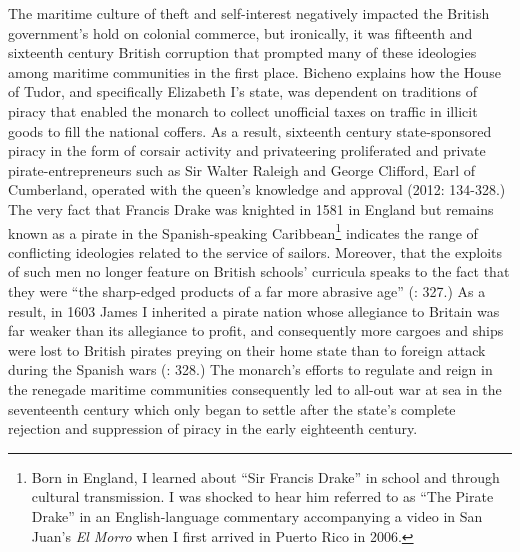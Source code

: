 The maritime culture of theft and self-interest negatively impacted the British government’s hold on colonial commerce, but ironically, it was fifteenth and sixteenth century British corruption that prompted many of these ideologies among maritime communities in the first place. Bicheno explains how the House of Tudor, and specifically Elizabeth I’s state, was dependent on traditions of piracy that enabled the monarch to collect unofficial taxes on traffic in illicit goods to fill the national coffers. As a result, sixteenth century state-sponsored piracy in the form of corsair activity and privateering proliferated and private pirate-entrepreneurs such as Sir Walter Raleigh and George Clifford, Earl of Cumberland, operated with the queen’s knowledge and approval (2012: 134-328.) The very fact that Francis Drake was knighted in 1581 in England but remains known as a pirate in the Spanish-speaking Caribbean\footnote{Born in England, I learned about “Sir Francis Drake” in school and through cultural transmission. I was shocked to hear him referred to as “The Pirate Drake” in an English-language commentary accompanying a video in San Juan’s \textit{El Morro} when I first arrived in Puerto Rico in 2006.}  indicates the range of conflicting ideologies related to the service of sailors.  Moreover, that the exploits of such men no longer feature on British schools’ curricula speaks to the fact that they were “the sharp-edged products of a far more abrasive age” (\citealt{Bicheno2012}: 327.) As a result, in 1603 James I inherited a pirate nation whose allegiance to Britain was far weaker than its allegiance to profit, and consequently more cargoes and ships were lost to British pirates preying on their home state than to foreign attack during the Spanish wars (\citealt{Bicheno2012}: 328.) The monarch’s efforts to regulate and reign in the renegade maritime communities consequently led to all-out war at sea in the seventeenth century which only began to settle after the state’s complete rejection and suppression of piracy in the early eighteenth century. 

